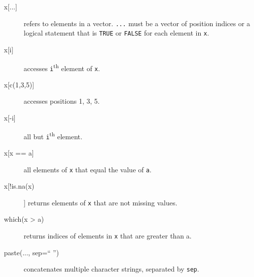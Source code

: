 \documentclass[a4paper,9pt]{extarticle}
\begin{document}
\begin{multicols}{3}
\begin{description}
\item[x{[...]}] refers to elements in a vector. \texttt{...} must be a vector of position indices or a logical statement that is \texttt{TRUE} or \texttt{FALSE} for each element in \texttt{x}.
\item[x{[i]}] accesses \texttt{i}\textsuperscript{th} element of \texttt{x}.
\item[x{[c(1,3,5)]}] accesses positions 1, 3, 5.
\item[x{[-i]}] all but \texttt{i}\textsuperscript{th} element.
\item[x{[x == a]}] all elements of \texttt{x} that equal the value of \texttt{a}.
\item[x[!is.na(x)]] returns elements of \texttt{x} that are not missing values.
\item[which(x > a)] returns indices of elements in \texttt{x} that are greater than a.
\item[paste(..., sep=`` '')] concatenates multiple character strings, separated by \texttt{sep}.
\end{description}



\end{multicols}
\end{document}
